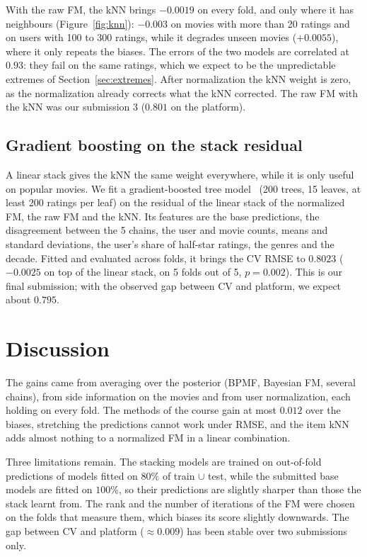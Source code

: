 \documentclass[10pt,a4paper,twocolumn]{article}
\begin{document}
With the raw FM, the kNN brings $-0.0019$ on every fold, and only where it has neighbours
(Figure~\ref{fig:knn}): $-0.003$ on movies with more than 20 ratings and on users with 100 to 300 ratings,
while it degrades unseen movies ($+0.0055$), where it only repeats the biases. The errors of the two models are
correlated at $0.93$: they fail on the same ratings, which we expect to be the unpredictable extremes of
Section~\ref{sec:extremes}. After normalization the kNN weight is zero, as the normalization already corrects
what the kNN corrected. The raw FM with the kNN was our submission 3 ($0.801$ on the platform).

\subsection{Gradient boosting on the stack residual}
A linear stack gives the kNN the same weight everywhere, while it is only useful on popular movies. We fit a
gradient-boosted tree model~\cite{friedman} (200 trees, 15 leaves, at least 200 ratings per leaf) on the
residual of the linear stack of the normalized FM, the raw FM and the kNN. Its features are the base
predictions, the disagreement between the 5 chains, the user and movie counts, means and standard deviations,
the user's share of half-star ratings, the genres and the decade. Fitted and evaluated across folds, it brings
the CV RMSE to $0.8023$ ($-0.0025$ on top of the linear stack, on 5 folds out of 5, $p = 0.002$). This is our
final submission; with the observed gap between CV and platform, we expect about $0.795$.

\section{Discussion}

The gains came from averaging over the posterior (BPMF, Bayesian FM, several chains), from side information
on the movies and from user normalization, each holding on every fold. The methods of the course gain at most
$0.012$ over the biases, stretching the predictions cannot work under RMSE, and the item kNN adds almost
nothing to a normalized FM in a linear combination.

Three limitations remain. The stacking models are trained on out-of-fold predictions of models fitted on
$80\%$ of train $\cup$ test, while the submitted base models are fitted on $100\%$, so their predictions are
slightly sharper than those the stack learnt from. The rank and the number of iterations of the FM were chosen
on the folds that measure them, which biases its score slightly downwards. The gap between CV and platform
($\approx 0.009$) has been stable over two submissions only.
\end{document}
